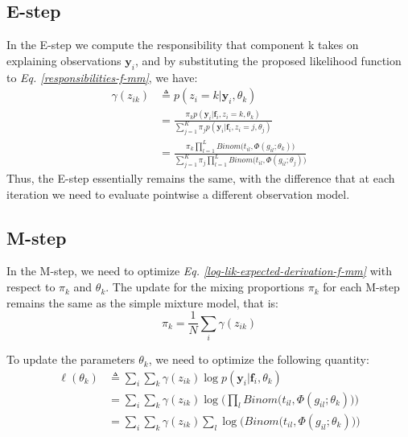 \subsection{E-step}
In the E-step we compute the responsibility that component k takes on explaining observations $\mathbf{y}_{i}$, and by substituting the proposed likelihood function to \emph{Eq. \ref{responsibilities-f-mm}}, we have:
\begin{equation} \label{responsibilities-binom-prob-model-f-meth}
  \begin{split}
	\gamma(z_{ik}) & \triangleq p(z_{i}=k|\mathbf{y}_{i},\theta_{k}) \\
				   & = \frac{\pi_{k}p(\mathbf{y}_{i}|\mathbf{f}_{i},z_{i}=k,\theta_{k})}{\sum\limits_{j=1}^{K} \pi_{j}p(\mathbf{y}_{i}|\mathbf{f}_{i},z_{i}=j,\theta_{j})} \\
				   & = \frac{\pi_{k} \prod\limits_{l=1}^{L} Binom \big(t_{il}, \Phi(g_{il}; \theta_{k})\big)} {\sum\limits_{j=1}^{K} \pi_{j} \prod\limits_{l=1}^{L} Binom \big(t_{il}, \Phi(g_{il}; \theta_{j})\big)}
  \end{split}
\end{equation}
Thus, the E-step essentially remains the same, with the difference that at each iteration we need to evaluate pointwise a different observation model. 

\subsection{M-step}
In the M-step, we need to optimize \emph{Eq. \ref{log-lik-expected-derivation-f-mm}} with respect to $\pi_{k}$ and $\theta_{k}$. The update for the mixing proportions $\pi_{k}$ for each M-step remains the same as the simple mixture model, that is:
\begin{equation} \label{mixing-proportions-binom-prob-est-f-meth}
		\pi_{k} = \frac{1}{N} \sum_{i} \gamma(z_{ik})
\end{equation}

To update the parameters $\theta_{k}$, we need to optimize the following quantity:
\begin{equation} \label{parameters-est2-binom-prob-EM-f-meth}
  \begin{split}
	\ell(\theta_{k}) & \triangleq \sum_{i} \sum_{k} \gamma(z_{ik}) \log p(\mathbf{y}_{i}|\mathbf{f}_{i}, \theta_{k}) \\
					 & = \sum_{i} \sum_{k} \gamma(z_{ik}) \log \bigg( \prod_{l} Binom \big(t_{il}, \Phi(g_{il}; \theta_{k})\big) \bigg)\\
					 & = \sum_{i} \sum_{k} \gamma(z_{ik}) \sum_{l} \log \bigg(Binom \big(t_{il}, \Phi(g_{il}; \theta_{k})\big) \bigg)
  \end{split}
\end{equation}

